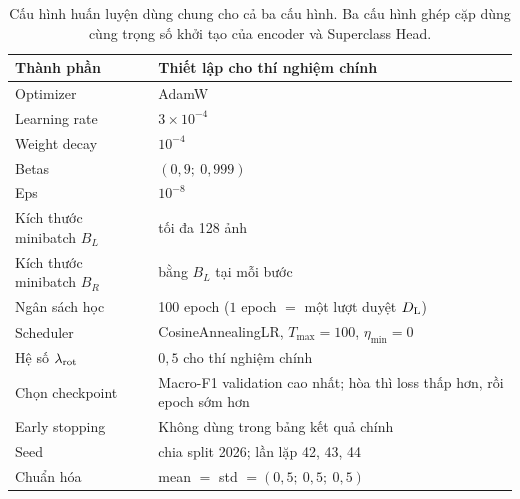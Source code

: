 \begin{table}[htbp]
  \centering
  \small
  \begin{tabular}{@{}l l@{}}
    \toprule
    Thành phần & Thiết lập cho thí nghiệm chính \\
    \midrule
    Optimizer & AdamW \\
    Learning rate & $3 \times 10^{-4}$ \\
    Weight decay & $10^{-4}$ \\
    Betas & $(0{,}9;\ 0{,}999)$ \\
    Eps & $10^{-8}$ \\
    Kích thước minibatch $B_L$ & tối đa 128 ảnh \\
    Kích thước minibatch $B_R$ & bằng $B_L$ tại mỗi bước \\
    Ngân sách học & 100 epoch ($1$ epoch $=$ một lượt duyệt $D_{\mathrm{L}}$) \\
    Scheduler & CosineAnnealingLR, $T_{\max}=100$, $\eta_{\min}=0$ \\
    Hệ số $\lambda_{\mathrm{rot}}$ & $0{,}5$ cho thí nghiệm chính \\
    Chọn checkpoint & Macro-F1 validation cao nhất; hòa thì loss thấp hơn, rồi epoch sớm hơn \\
    Early stopping & Không dùng trong bảng kết quả chính \\
    Seed & chia split 2026; lần lặp 42, 43, 44 \\
    Chuẩn hóa & mean $=$ std $= (0{,}5;\ 0{,}5;\ 0{,}5)$ \\
    \bottomrule
  \end{tabular}
  \caption{Cấu hình huấn luyện dùng chung cho cả ba cấu hình. Ba cấu hình ghép cặp dùng cùng trọng số khởi tạo của encoder và Superclass Head.}
  \label{tab:hyperparams}
\end{table}